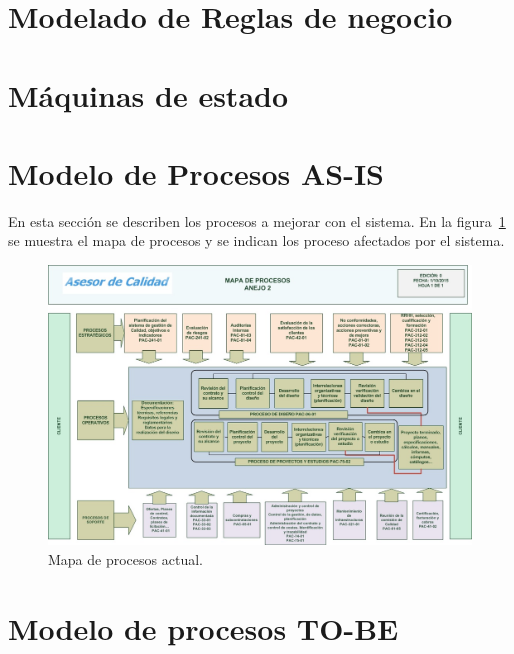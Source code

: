 \section{Modelado de Reglas de negocio}





\section{Máquinas de estado}



\section{Modelo de Procesos AS-IS}


En esta sección se describen los procesos a mejorar con el sistema. En la figura~\ref{fig:mapaProc} se muestra el mapa de procesos y se indican los proceso afectados por el sistema.

\begin{figure}[htbp]
	\begin{center}
		\includegraphics[width=.8\textwidth]{images/mapaProc}
		\caption{Mapa de procesos actual.}
		\label{fig:mapaProc}
	\end{center}
\end{figure}


%
%
%

\section{Modelo de procesos TO-BE}

